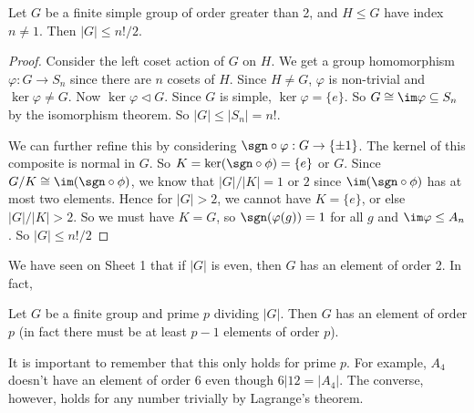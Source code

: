 \documentclass[a4paper]{article}
\begin{document}
\begin{eg}
  Let $G$ be a finite simple group of order greater than 2, and $H\leq G$ have index $n\not= 1$. Then $|G| \leq n!/2$.
\end{eg}

\begin{proof}
  Consider the left coset action of $G$ on $H$. We get a group homomorphism $\varphi: G\to S_n$ since there are $n$ cosets of $H$. Since $H\not= G$, $\varphi$ is non-trivial and $\ker \varphi \not=G$. Now $\ker \varphi \lhd G$. Since $G$ is simple, $\ker\varphi = \{e\}$. So $G\cong \im \varphi \subseteq S_n$ by the isomorphism theorem. So $|G| \leq |S_n| = n!$.

  We can further refine this by considering $\sgn\circ \varphi: G \to \{\pm 1\}$. The kernel of this composite is normal in $G$. So $K = \ker(\sgn\circ\phi) = \{e\}$ or $G$. Since $G/K\cong \im (\sgn\circ\phi)$, we know that $|G|/|K| = 1$ or $2$ since $\im(\sgn\circ \phi)$ has at most two elements. Hence for $|G|> 2$, we cannot have $K = \{e\}$, or else $|G|/|K| > 2$. So we must have $K = G$, so $\sgn(\varphi(g)) = 1$ for all $g$ and $\im \varphi \leq A_n$. So $|G|\leq n!/2$
\end{proof}

We have seen on Sheet 1 that if $|G|$ is even, then $G$ has an element of order 2. In fact,
\begin{thm}
  Let $G$ be a finite group and prime $p$ dividing $|G|$. Then $G$ has an element of order $p$ (in fact there must be at least $p - 1$ elements of order $p$).
\end{thm}
It is important to remember that this only holds for prime $p$. For example, $A_4$ doesn't have an element of order $6$ even though $6 | 12 = |A_4|$. The converse, however, holds for any number trivially by Lagrange's theorem.
\end{document}
